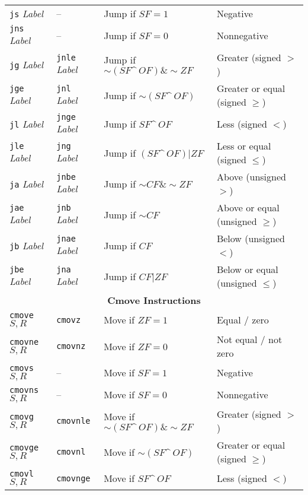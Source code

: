 \documentclass{article}
\begin{document}
\begin{table}[h]
\begin{tabular}{l l l l}
        \texttt{js} \textit{Label}  & – & Jump if $SF = 1$ & Negative \\
        \texttt{jns} \textit{Label}  & – & Jump if $SF = 0$ & Nonnegative \\
        \texttt{jg} \textit{Label}  & \texttt{jnle} \textit{Label} & Jump if $\sim (SF \^\ OF) \& \sim ZF$ & Greater (signed $>$) \\
        \texttt{jge} \textit{Label}  & \texttt{jnl} \textit{Label} & Jump if $\sim (SF \^\ OF)$ & Greater or equal (signed $\geq$) \\
        \texttt{jl} \textit{Label}  & \texttt{jnge} \textit{Label} & Jump if $SF \^\ OF$ & Less (signed $<$) \\
        \texttt{jle} \textit{Label}  & \texttt{jng} \textit{Label} & Jump if $(SF \^\ OF) | ZF$ & Less or equal (signed $\leq$) \\
        \texttt{ja} \textit{Label}  & \texttt{jnbe} \textit{Label} & Jump if $\sim CF \& \sim ZF$ & Above (unsigned $>$) \\
        \texttt{jae} \textit{Label}  & \texttt{jnb} \textit{Label} & Jump if $\sim CF$ & Above or equal (unsigned $\geq$) \\
        \texttt{jb} \textit{Label}  & \texttt{jnae} \textit{Label} & Jump if $CF$ & Below (unsigned $<$) \\
        \texttt{jbe} \textit{Label}  & \texttt{jna} \textit{Label} & Jump if $CF | ZF$ & Below or equal (unsigned $\leq$) \\
        \midrule
        \multicolumn{4}{c}{\textbf{Cmove Instructions}} \\
        \midrule
        \texttt{cmove} $S, R$  & \texttt{cmovz} & Move if $ZF = 1$ & Equal / zero \\
        \texttt{cmovne} $S, R$  & \texttt{cmovnz} & Move if $ZF = 0$ & Not equal / not zero \\
        \texttt{cmovs} $S, R$  & – & Move if $SF = 1$ & Negative \\
        \texttt{cmovns} $S, R$  & – & Move if $SF = 0$ & Nonnegative \\
        \texttt{cmovg} $S, R$  & \texttt{cmovnle} & Move if $\sim (SF \^\ OF) \& \sim ZF$ & Greater (signed $>$) \\
        \texttt{cmovge} $S, R$  & \texttt{cmovnl} & Move if $\sim (SF \^\ OF)$ & Greater or equal (signed $\geq$) \\
        \texttt{cmovl} $S, R$  & \texttt{cmovnge} & Move if $SF \^\ OF$ & Less (signed $<$) \\

\end{tabular}
\end{table}
\end{document}
